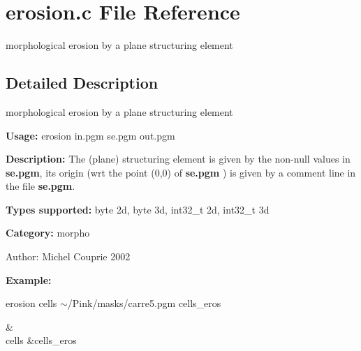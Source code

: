 \section{erosion.c File Reference}
\label{erosion_8c}
morphological erosion by a plane structuring element 



\subsection{Detailed Description}
morphological erosion by a plane structuring element 

{\bf Usage:} erosion in.pgm se.pgm out.pgm

{\bf Description:} The (plane) structuring element is given by the non-null values in {\bf se.pgm}, its origin (wrt the point (0,0) of {\bf se.pgm} ) is given by a comment line in the file {\bf se.pgm}.

{\bf Types supported:} byte 2d, byte 3d, int32\_\-t 2d, int32\_\-t 3d

{\bf Category:} morpho

\begin{Desc}
\item[Author:]Michel Couprie 2002\end{Desc}
{\bf Example:}

erosion cells $\sim$/Pink/masks/carre5.pgm cells\_\-eros

\begin{TabularC}{2}
\hline
 &  \\\hline
cells &cells\_\-eros  \\\hline
\end{TabularC}
